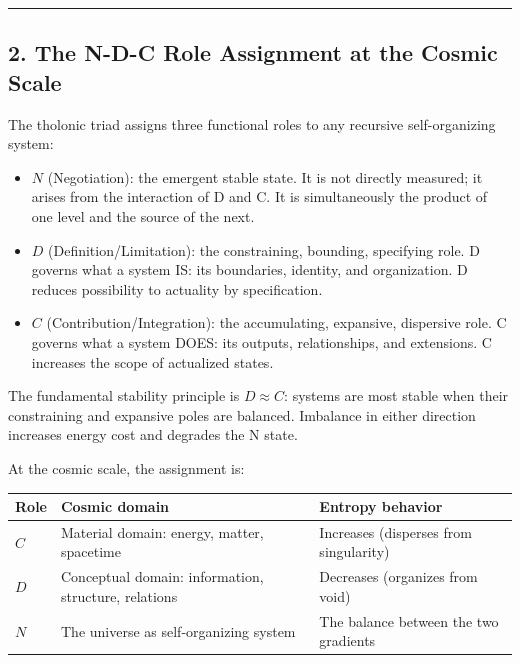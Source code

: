 \documentclass[
  11pt,
  letterpaper,
]{article}
\providecommand{\tightlist}{%
  \setlength{\itemsep}{0pt}\setlength{\parskip}{0pt}}
\begin{document}
\begin{center}\rule{0.5\linewidth}{0.5pt}\end{center}

\subsection{2. The N-D-C Role Assignment at the Cosmic
Scale}\label{the-n-d-c-role-assignment-at-the-cosmic-scale}

The tholonic triad assigns three functional roles to any recursive
self-organizing system:

\begin{itemize}
\tightlist
\item
  \(N\) (Negotiation): the emergent stable state. It is not directly
  measured; it arises from the interaction of D and C. It is
  simultaneously the product of one level and the source of the next.
\item
  \(D\) (Definition/Limitation): the constraining, bounding, specifying
  role. D governs what a system IS: its boundaries, identity, and
  organization. D reduces possibility to actuality by specification.
\item
  \(C\) (Contribution/Integration): the accumulating, expansive,
  dispersive role. C governs what a system DOES: its outputs,
  relationships, and extensions. C increases the scope of actualized
  states.
\end{itemize}

The fundamental stability principle is \(D \approx C\): systems are most
stable when their constraining and expansive poles are balanced.
Imbalance in either direction increases energy cost and degrades the N
state.

At the cosmic scale, the assignment is:

\begin{longtable}[]{@{}
  >{\raggedright\arraybackslash}p{}
  >{\raggedright\arraybackslash}p{}
  >{\raggedright\arraybackslash}p{}@{}}
\toprule\noalign{}
\begin{minipage}[b]{\linewidth}\raggedright
Role
\end{minipage} & \begin{minipage}[b]{\linewidth}\raggedright
Cosmic domain
\end{minipage} & \begin{minipage}[b]{\linewidth}\raggedright
Entropy behavior
\end{minipage} \\
\midrule\noalign{}
\endhead
\bottomrule\noalign{}
\endlastfoot
\(C\) & Material domain: energy, matter, spacetime & Increases
(disperses from singularity) \\
\(D\) & Conceptual domain: information, structure, relations & Decreases
(organizes from void) \\
\(N\) & The universe as self-organizing system & The balance between the
two gradients \\
\end{longtable}
\end{document}

